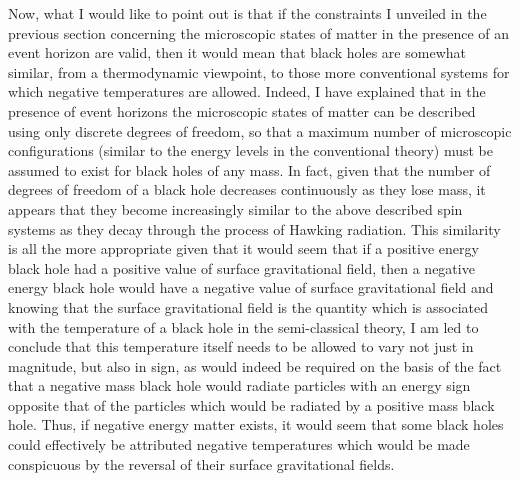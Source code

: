\documentclass[notitlepage,12pt]{report}
\begin{document}
Now, what I would like to point out is that if the constraints I unveiled in the previous section concerning the microscopic states of matter in the presence of an event horizon are valid, then it would mean that black holes are somewhat similar, from a thermodynamic viewpoint, to those more conventional systems for which negative temperatures are allowed. Indeed, I have explained that in the presence of event horizons the microscopic states of matter can be described using only discrete degrees of freedom, so that a maximum number of microscopic configurations (similar to the energy levels in the conventional theory) must be assumed to exist for black holes of any mass. In fact, given that the number of degrees of freedom of a black hole decreases continuously as they lose mass, it appears that they become increasingly similar to the above described spin systems as they decay through the process of Hawking radiation. This similarity is all the more appropriate given that it would seem that if a positive energy black hole had a positive value of surface gravitational field, then a negative energy black hole would have a negative value of surface gravitational field and knowing that the surface gravitational field is the quantity which is associated with the temperature of a black hole in the semi-classical theory, I am led to conclude that this temperature itself needs to be allowed to vary not just in magnitude, but also in sign, as would indeed be required on the basis of the fact that a negative mass black hole would radiate particles with an energy sign opposite that of the particles which would be radiated by a positive mass black hole. Thus, if negative energy matter exists, it would seem that some black holes could effectively be attributed negative temperatures which would be made conspicuous by the reversal of their surface gravitational fields.
\end{document}
